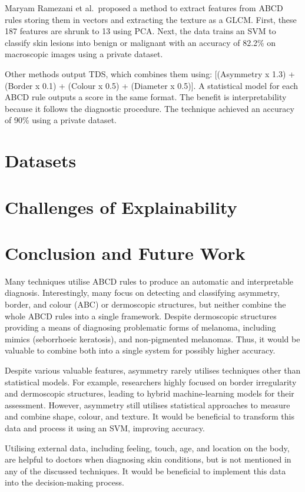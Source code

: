 Maryam Ramezani et al.\ proposed a method to extract features from ABCD rules storing them in vectors and extracting the texture as a GLCM. First, these 187 features are shrunk to 13 using PCA\cite{Ramezani2014}. Next, the data trains an SVM to classify skin lesions into benign or malignant with an accuracy of 82.2\% on macroscopic images using a private dataset.

Other methods output TDS\cite{Zaqout2016, Zhang2018}, which combines them using: [(Asymmetry x 1.3) + (Border x 0.1) + (Colour x 0.5) + (Diameter x 0.5)]. A statistical model for each ABCD rule outputs a score in the same format. The benefit is interpretability because it follows the diagnostic procedure. The technique achieved an accuracy of 90\% using a private dataset.

\section{Datasets}

\section{Challenges of Explainability}

\section{Conclusion and Future Work}
Many techniques utilise ABCD rules to produce an automatic and interpretable diagnosis. Interestingly, many focus on detecting and classifying asymmetry, border, and colour (ABC) or dermoscopic structures, but neither combine the whole ABCD rules into a single framework. Despite dermoscopic structures providing a means of diagnosing problematic forms of melanoma, including mimics (seborrhoeic keratosis)\cite{Izikson2002}, and non-pigmented melanomas. Thus, it would be valuable to combine both into a single system for possibly higher accuracy.

Despite various valuable features, asymmetry rarely utilises techniques other than statistical models. For example, researchers highly focused on border irregularity and dermoscopic structures, leading to hybrid machine-learning models for their assessment. However, asymmetry still utilises statistical approaches to measure and combine shape, colour, and texture. It would be beneficial to transform this data and process it using an SVM, improving accuracy.

Utilising external data, including feeling, touch, age, and location on the body, are helpful to doctors when diagnosing skin conditions, but is not mentioned in any of the discussed techniques. It would be beneficial to implement this data into the decision-making process.
